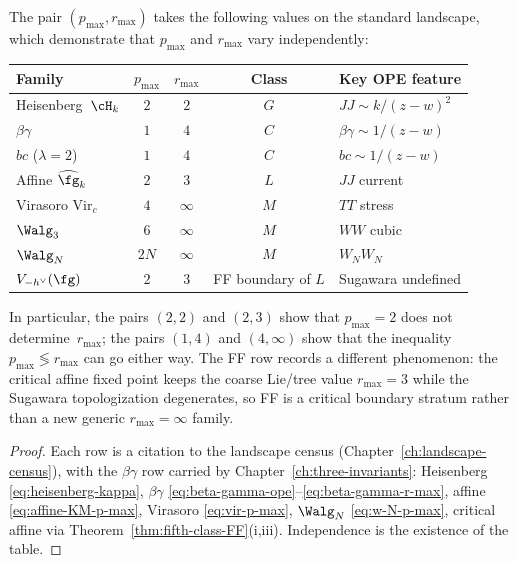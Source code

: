 \begin{theorem}
\label{thm:pole-depth-independence}
\ClaimStatusConditional
The pair $(p_{\max}, r_{\max})$ takes the following values on the
standard landscape, which demonstrate that $p_{\max}$ and $r_{\max}$
vary independently:
\begin{center}
\renewcommand{\arraystretch}{1.3}
\begin{tabular}{lcccl}
Family & $p_{\max}$ & $r_{\max}$ & Class & Key OPE feature \\
\hline
Heisenberg~$\cH_k$ & $2$ & $2$ & $G$ & $JJ\sim k/(z-w)^2$ \\
$\beta\gamma$ & $1$ & $4$ & $C$ & $\beta\gamma\sim 1/(z-w)$ \\
$bc$ ($\lambda = 2$) & $1$ & $4$ & $C$ & $bc\sim 1/(z-w)$ \\
Affine $\widehat{\fg}_k$ & $2$ & $3$ & $L$ & $JJ$ current \\
Virasoro $\mathrm{Vir}_c$ & $4$ & $\infty$ & $M$ & $TT$ stress \\
$\Walg_3$ & $6$ & $\infty$ & $M$ & $WW$ cubic \\
$\Walg_N$ & $2N$ & $\infty$ & $M$ & $W_NW_N$ \\
	$V_{-h^\vee}(\fg)$ & $2$ & $3$ & FF boundary of $L$ & Sugawara undefined
	\end{tabular}
	\end{center}
	In particular, the pairs $(2,2)$ and $(2,3)$ show that $p_{\max}=2$
	does not determine~$r_{\max}$; the pairs $(1,4)$ and $(4,\infty)$
	show that the inequality~$p_{\max} \lessgtr r_{\max}$ can go either
	way. The FF row records a different phenomenon: the critical affine
	fixed point keeps the coarse Lie/tree value $r_{\max}=3$ while the
	Sugawara topologization degenerates, so FF is a critical boundary
	stratum rather than a new generic $r_{\max}=\infty$ family.
\end{theorem}

\begin{proof}
Each row is a citation to the landscape census
	\textup{(}Chapter~\ref{ch:landscape-census}\textup{)}, with the
	$\beta\gamma$ row carried by
	Chapter~\ref{ch:three-invariants}: Heisenberg
	\eqref{eq:heisenberg-kappa}, $\beta\gamma$
	\eqref{eq:beta-gamma-ope}--\eqref{eq:beta-gamma-r-max}, affine
	\eqref{eq:affine-KM-p-max}, Virasoro \eqref{eq:vir-p-max},
	$\Walg_N$ \eqref{eq:w-N-p-max}, critical affine via
	Theorem~\ref{thm:fifth-class-FF}\textup{(}i,iii\textup{)}. Independence is the
	existence of the table.
\end{proof}

